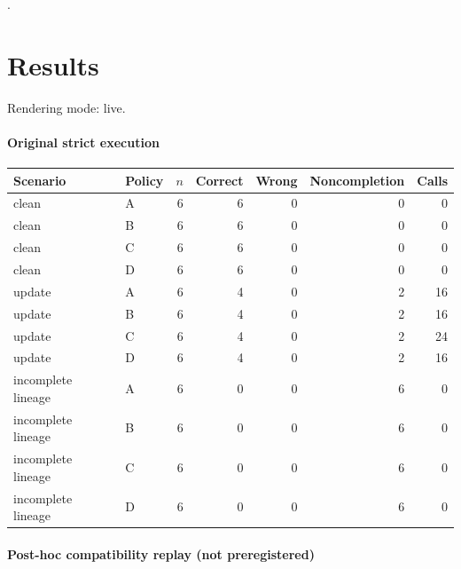 \documentclass{article}
\begin{document}
\citep{ref0002,ref0001}.

\section{Results}

Rendering mode: live. 

\paragraph{Original strict execution}

\begin{center}

{\footnotesize\setlength{\tabcolsep}{3pt}\begin{tabular}{llrrrrr}\hline

Scenario & Policy & $n$ & Correct & Wrong & Noncompletion & Calls \\\hline

clean & A & 6 & 6 & 0 & 0 & 0 \\

clean & B & 6 & 6 & 0 & 0 & 0 \\

clean & C & 6 & 6 & 0 & 0 & 0 \\

clean & D & 6 & 6 & 0 & 0 & 0 \\

update & A & 6 & 4 & 0 & 2 & 16 \\

update & B & 6 & 4 & 0 & 2 & 16 \\

update & C & 6 & 4 & 0 & 2 & 24 \\

update & D & 6 & 4 & 0 & 2 & 16 \\

incomplete lineage & A & 6 & 0 & 0 & 6 & 0 \\

incomplete lineage & B & 6 & 0 & 0 & 6 & 0 \\

incomplete lineage & C & 6 & 0 & 0 & 6 & 0 \\

incomplete lineage & D & 6 & 0 & 0 & 6 & 0 \\

\hline\end{tabular}}\end{center}

\paragraph{Post-hoc compatibility replay (not preregistered)}
\end{document}

